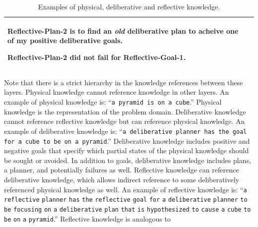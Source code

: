 \begin{table}
\begin{tabular}{|p{2cm}|p{10cm}|}
\begin{packed_itemize}
\item{Reflective-Plan-2 is to find an {\emph{old}} deliberative plan
  to acheive one of my positive deliberative goals.}
\item{Reflective-Plan-2 did not fail for Reflective-Goal-1.}
\end{packed_itemize} \\
\hline
\end{tabular}
\caption{Examples of physical, deliberative and reflective knowledge.}
\label{table:physical_deliberative_reflective_knowledge}
\end{table}
Note that there is a strict hierarchy in the knowledge references
between these layers.  Physical knowledge cannot reference knowledge
in other layers.  An example of physical knowledge is: ``{\tt{a
    pyramid is on a cube}}.''  Physical knowledge is the
representation of the problem domain.  Deliberative knowledge cannot
reference reflective knowledge but can reference physical knowledge.
An example of deliberative knowledge is: ``{\tt{a deliberative planner
    has the goal for a cube to be on a pyramid}}.''  Deliberative
knowledge includes positive and negative goals that specify which
partial states of the physical knowledge should be sought or avoided.
In addition to goals, deliberative knowledge includes plans, a
planner, and potentially failures as well.  Reflective knowledge can
reference deliberative knowledge, which allows indirect reference to
some deliberatively referenced physical knowledge as well.  An example
of reflective knowledge is: ``{\tt{a}} {\tt{reflective}}
{\tt{planner}} {\tt{has}} {\tt{the}} {\tt{reflective}} {\tt{goal}}
{\tt{for}} {\tt{a}} {\tt{deliberative}} {\tt{planner}} {\tt{to}}
{\tt{be}} {\tt{focusing}} {\tt{on}} {\tt{a}} {\tt{deliberative}}
{\tt{plan}} {\tt{that}} {\tt{is}} {\tt{hypothesized}} {\tt{to}}
{\tt{cause}} {\tt{a}} {\tt{cube}} {\tt{to}} {\tt{be}} {\tt{on}}
{\tt{a}} {\tt{pyramid}}.''  Reflective knowledge is analogous to
